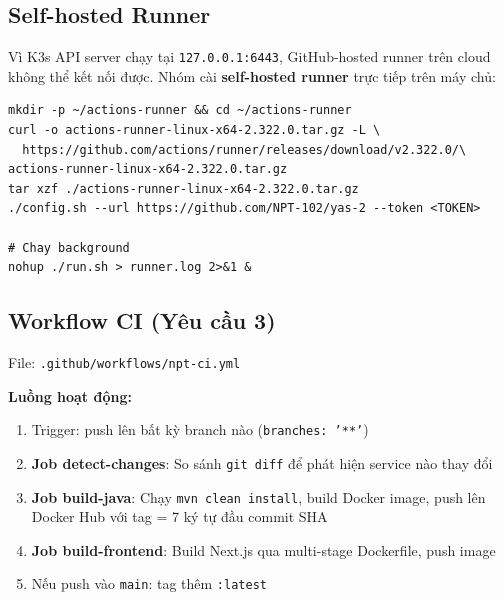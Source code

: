 \subsection{Self-hosted Runner}

Vì K3s API server chạy tại \texttt{127.0.0.1:6443}, GitHub-hosted runner trên cloud
không thể kết nối được. Nhóm cài \textbf{self-hosted runner} trực tiếp trên máy chủ:

\begin{lstlisting}[style=bashstyle, caption=Cài và chạy self-hosted runner]
mkdir -p ~/actions-runner && cd ~/actions-runner
curl -o actions-runner-linux-x64-2.322.0.tar.gz -L \
  https://github.com/actions/runner/releases/download/v2.322.0/\
actions-runner-linux-x64-2.322.0.tar.gz
tar xzf ./actions-runner-linux-x64-2.322.0.tar.gz
./config.sh --url https://github.com/NPT-102/yas-2 --token <TOKEN>

# Chay background
nohup ./run.sh > runner.log 2>&1 &
\end{lstlisting}

\subsection{Workflow CI (Yêu cầu 3)}

File: \texttt{.github/workflows/npt-ci.yml}

\textbf{Luồng hoạt động:}
\begin{enumerate}
	\item Trigger: push lên bất kỳ branch nào (\texttt{branches: '**'})
	\item \textbf{Job detect-changes}: So sánh \texttt{git diff} để phát hiện service nào thay đổi
	\item \textbf{Job build-java}: Chạy \texttt{mvn clean install}, build Docker image, push lên Docker Hub
	      với tag = 7 ký tự đầu commit SHA
	\item \textbf{Job build-frontend}: Build Next.js qua multi-stage Dockerfile, push image
	\item Nếu push vào \texttt{main}: tag thêm \texttt{:latest}
\end{enumerate}

